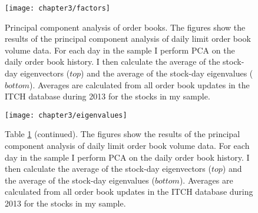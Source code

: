 \begin{figure}[p]
	\linespread{1}
	\centering
	\texttt{[image: chapter3/factors]}
	\captionsetup{skip=-20pt, font=footnotesize, justification=justified, width=\linewidth}
	\caption[Principal component analysis of order books]{Principal component analysis of order books. The figures show the results of the principal component analysis of daily limit order book volume data. For each day in the sample I perform PCA on the daily order book history. I then calculate the average of the stock-day eigenvectors ($top$) and the average of the stock-day eigenvalues ($bottom$). Averages are calculated from all order book updates in the ITCH database during 2013 for the stocks in my sample.}
	\label{fig:pca}
\end{figure}

\begin{figure}[p]
	\linespread{1}
	\centering
	\texttt{[image: chapter3/eigenvalues]}
	\captionsetup{skip=-20pt, font=footnotesize, justification=justified, width=\linewidth}
	\caption*{Table \ref{fig:pca} (continued). The figures show the results of the principal component analysis of daily limit order book volume data. For each day in the sample I perform PCA on the daily order book history. I then calculate the average of the stock-day eigenvectors ($top$) and the average of the stock-day eigenvalues ($bottom$). Averages are calculated from all order book updates in the ITCH database during 2013 for the stocks in my sample.}
\end{figure}
